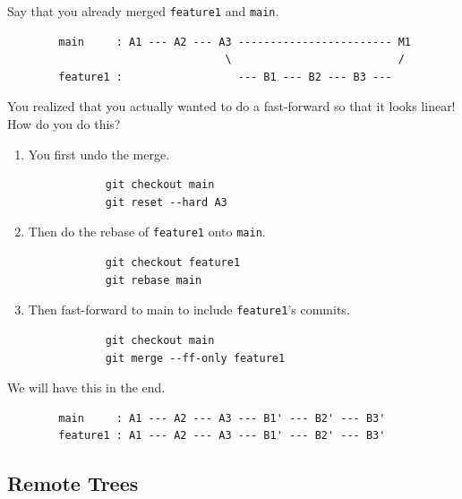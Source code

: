     \begin{example}
      Say that you already merged \texttt{feature1} and \texttt{main}. 
      \begin{lstlisting}
        main     : A1 --- A2 --- A3 ------------------------ M1
                                  \                          /
        feature1 :                  --- B1 --- B2 --- B3 ---  
      \end{lstlisting}
      You realized that you actually wanted to do a fast-forward so that it looks linear! How do you do this? 
      \begin{enumerate}
        \item You first undo the merge. 
          \begin{lstlisting}
            git checkout main 
            git reset --hard A3
          \end{lstlisting} 

        \item Then do the rebase of \texttt{feature1} onto \texttt{main}. 
          \begin{lstlisting}
            git checkout feature1 
            git rebase main 
          \end{lstlisting} 

        \item Then fast-forward to main to include \texttt{feature1}'s commits. 
          \begin{lstlisting}
            git checkout main 
            git merge --ff-only feature1
          \end{lstlisting}
      \end{enumerate}
      We will have this in the end. 
      \begin{lstlisting}
        main     : A1 --- A2 --- A3 --- B1' --- B2' --- B3' 
        feature1 : A1 --- A2 --- A3 --- B1' --- B2' --- B3'
      \end{lstlisting}
    \end{example} 

\subsection{Remote Trees}

